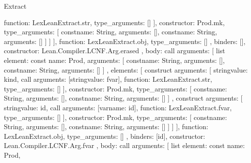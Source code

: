 \begin{lexlean}{Extract}
\begin{toolingmodule}
{{{{{{{{                          function: LexLeanExtract.str,
                          type_arguments: []
                        }
                      ],
                      constructor: Prod.mk,
                      type_arguments: [
                        const{name: String, arguments: []},
                        const{name: String, arguments: []}
                      ]
                    }
                  ]
                }
              ],
              function: LexLeanExtract.obj,
              type_arguments: []
            },
            binders: [],
            constructor: Lean.Compiler.LCNF.Arg.erased
          },
          {
            body: call{
              arguments: [
                list{
                  element: const{
                    name: Prod,
                    arguments: [
                      const{name: String, arguments: []},
                      const{name: String, arguments: []}
                    ]
                  },
                  elements: [
                    construct{
                      arguments: [
                        string{value: kind},
                        call{
                          arguments: [string{value: fvar}],
                          function: LexLeanExtract.str,
                          type_arguments: []
                        }
                      ],
                      constructor: Prod.mk,
                      type_arguments: [
                        const{name: String, arguments: []},
                        const{name: String, arguments: []}
                      ]
                    },
                    construct{
                      arguments: [
                        string{value: id},
                        call{
                          arguments: [var{name: id}],
                          function: LexLeanExtract.fvar,
                          type_arguments: []
                        }
                      ],
                      constructor: Prod.mk,
                      type_arguments: [
                        const{name: String, arguments: []},
                        const{name: String, arguments: []}
                      ]
                    }
                  ]
                }
              ],
              function: LexLeanExtract.obj,
              type_arguments: []
            },
            binders: [id],
            constructor: Lean.Compiler.LCNF.Arg.fvar
          },
          {
            body: call{
              arguments: [
                list{
                  element: const{
                    name: Prod,
}}}}}}}
\end{toolingmodule}
\end{lexlean}
